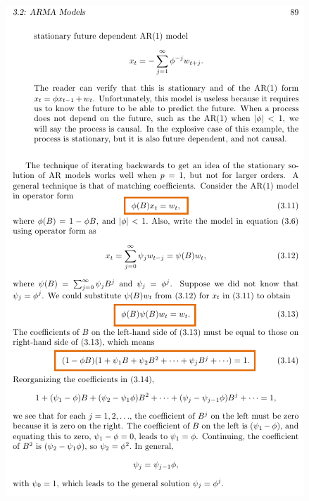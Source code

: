 \documentclass{article}
\begin{document}
\newpage\includegraphics[width=.9\textwidth]{shumway6}
\end{document}
